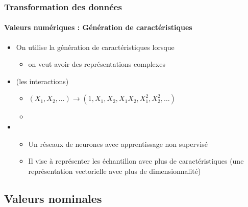\documentclass[xcolor=table]{beamer}
\begin{document}
\begin{frame}
	\frametitle{Transformation des données}
	\framesubtitle{Valeurs numériques : Génération de caractéristiques}
	
			
			\begin{itemize}
				\item On utilise la génération de caractéristiques lorsque
				\begin{itemize}
					\item on veut avoir des représentations complexes 
				\end{itemize}
				\item {} (les interactions)
				\begin{itemize}
					\item $(X_1, X_2, \ldots) \longrightarrow (1, X_1, X_2, X_1 X_2, X_1^2, X_2^2, \ldots)$
					\item {}
				\end{itemize}
				\item {}
				\begin{itemize}
					\item Un réseaux de neurones avec apprentissage non supervisé 
					\item Il vise à représenter les échantillon avec plus de caractéristiques (une représentation vectorielle avec plus de dimensionnalité)
				\end{itemize}
			\end{itemize}
	
\end{frame}

\subsection{Valeurs nominales}
\end{document}
